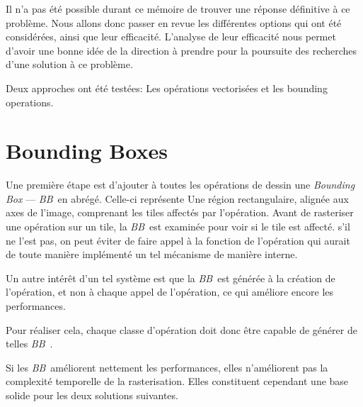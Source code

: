 		Il n'a pas été possible durant ce mémoire de trouver une réponse définitive à ce problème. Nous allons donc 
		passer en revue les différentes options qui ont été considérées, ainsi que leur efficacité. L'analyse de leur
		efficacité nous permet d'avoir une bonne idée de la direction à prendre pour la poursuite des recherches d'une
		solution à ce problème.

		Deux approches ont été testées: Les opérations vectorisées et les bounding operations. 	


	\section{Bounding Boxes}
\newcommand{\BB}{\emph{BB}~}
		Une première étape est d'ajouter à toutes les opérations de dessin une \emph{Bounding Box} --- \BB en abrégé.
		Celle-ci représente
		Une région rectangulaire, alignée aux axes de l'image, comprenant les tiles affectés par l'opération. Avant de rasteriser une opération 
		sur un tile, la \BB est examinée pour voir si le tile est affecté. s'il ne l'est pas, on peut éviter 
		de faire appel à la fonction de l'opération qui aurait de toute manière implémenté un tel mécanisme 
		de manière interne.

		Un autre intérêt d'un tel système est que la \BB est générée à la création de l'opération, et non à
		chaque appel de l'opération, ce qui améliore encore les performances.
		
		Pour réaliser cela, chaque classe d'opération doit donc être capable de générer de telles \BB.

		Si les \BB améliorent nettement les performances, elles n'améliorent pas la complexité
		temporelle de la rasterisation. Elles constituent cependant une base solide pour les deux solutions suivantes. 

